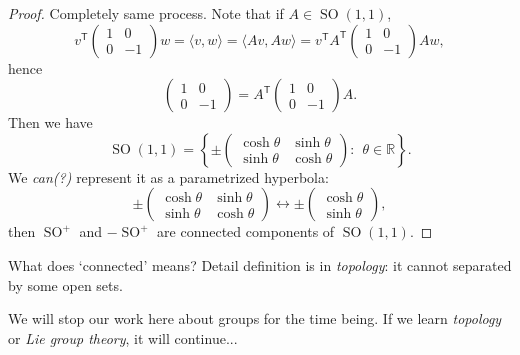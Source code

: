 \begin{proof}
Completely same process. Note that if $A\in\operatorname{SO}(1,1)$, $$v^\mathsf T \begin{pmatrix}1&0\\0&-1\end{pmatrix}w = \langle v,w\rangle = \langle Av,Aw\rangle =v^\mathsf T A^\mathsf T \begin{pmatrix}1&0\\0&-1\end{pmatrix}Aw,$$ hence $$\begin{pmatrix}1&0\\0&-1\end{pmatrix} = A^\mathsf T \begin{pmatrix}1&0\\0&-1\end{pmatrix} A.$$ Then we have $$\operatorname{SO}(1,1) = \left\{ \pm \begin{pmatrix}\cosh \theta & \sinh \theta \\ \sinh \theta & \cosh \theta\end{pmatrix}:~~ \theta\in\mathbb R \right\}.$$ We \textit{can(?)} represent it as a parametrized hyperbola: $$\pm \begin{pmatrix}\cosh \theta & \sinh \theta \\ \sinh \theta & \cosh \theta\end{pmatrix} \longleftrightarrow \pm\begin{pmatrix}\cosh \theta\\ \sinh \theta\end{pmatrix},$$ then $\operatorname{SO}^+$ and $-\operatorname{SO}^+$ are connected components of $\operatorname{SO}(1,1).$
\end{proof}
What does `connected' means? Detail definition is in \textit{topology}: it cannot separated by some open sets.

We will stop our work here about groups for the time being. If we learn \textit{topology} or \textit{Lie group theory}, it will continue...
